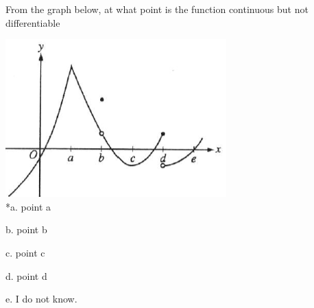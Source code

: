 
From the graph below, at what point is the function continuous but not differentiable

\includegraphics[width=3.35417in,height=2.39583in]{../../Images/DerivativeQ16.png}\\

*a. point a

b. point b

c. point c

d. point d

e. I do not know.\\
